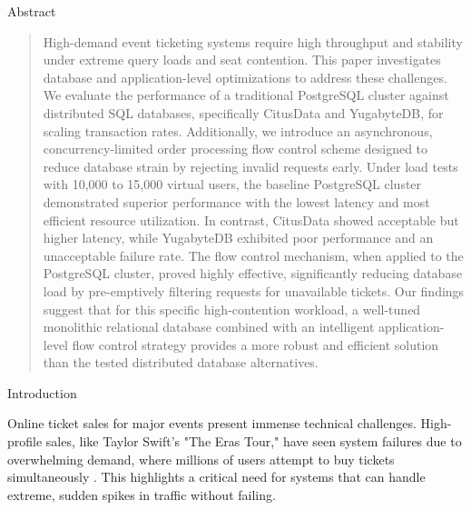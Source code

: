 \documentclass[a0,landscape]{config/poster/a0poster}
\newcommand{\postersection}[1]{%
  \begin{tcolorbox}[
    colback=IEEEblue,
    colframe=IEEEblue,
    fonttitle=\bfseries,
    coltext=white,
    sharp corners,
    boxrule=0pt,
    top=4pt,
    bottom=4pt,
    halign=center
  ]
    \large #1
  \end{tcolorbox}%
}
\begin{document}
\begin{multicols}{4} %


    \postersection{Abstract}
    \begin{quote}
        High-demand event ticketing systems require high throughput and stability under extreme query loads and seat contention. This paper investigates database and application-level optimizations to address these challenges. We evaluate the performance of a traditional PostgreSQL cluster against distributed SQL databases, specifically CitusData and YugabyteDB, for scaling transaction rates. Additionally, we introduce an asynchronous, concurrency-limited order processing flow control scheme designed to reduce database strain by rejecting invalid requests early. Under load tests with 10,000 to 15,000 virtual users, the baseline PostgreSQL cluster demonstrated superior performance with the lowest latency and most efficient resource utilization. In contrast, CitusData showed acceptable but higher latency, while YugabyteDB exhibited poor performance and an unacceptable failure rate. The flow control mechanism, when applied to the PostgreSQL cluster, proved highly effective, significantly reducing database load by pre-emptively filtering requests for unavailable tickets. Our findings suggest that for this specific high-contention workload, a well-tuned monolithic relational database combined with an intelligent application-level flow control strategy provides a more robust and efficient solution than the tested distributed database alternatives.
    \end{quote}


    \postersection{Introduction}
    Online ticket sales for major events present immense technical challenges. High-profile sales, like Taylor Swift's "The Eras Tour," have seen system failures due to overwhelming demand, where millions of users attempt to buy tickets simultaneously \cite{swiftTicketmaster}. This highlights a critical need for systems that can handle extreme, sudden spikes in traffic without failing.


\end{multicols}
\end{document}
